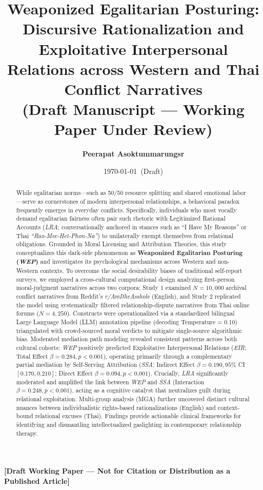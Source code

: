 \documentclass[11pt,a4paper]{article}
\title{\textbf{\Large Weaponized Egalitarian Posturing: Discursive Rationalization and Exploitative Interpersonal Relations across Western and Thai Conflict Narratives}\\[1.2ex]
\large \textbf{\textcolor{red!75!black}{(Draft Manuscript --- Working Paper Under Review)}}}
\author{\textbf{Peerapat Asoktummarungsr}}
\date{\today\ (Draft)}
\begin{document}
\maketitle
\thispagestyle{fancy}

\begin{center}
\small \textcolor{red!75!black}{\textbf{[Draft Working Paper --- Not for Citation or Distribution as a Published Article]}}
\end{center}
\vspace{1ex}

\begin{abstract}
\noindent While egalitarian norms---such as 50/50 resource splitting and shared emotional labor---serve as cornerstones of modern interpersonal relationships, a behavioral paradox frequently emerges in everyday conflicts. Specifically, individuals who most vocally demand egalitarian fairness often pair such rhetoric with Legitimized Rational Accounts (\textit{LRA}; conversationally anchored in stances such as ``I Have My Reasons'' or Thai \textit{``Rao-Mee-Het-Phon-Na''}) to unilaterally exempt themselves from relational obligations. Grounded in Moral Licensing and Attribution Theories, this study conceptualizes this dark-side phenomenon as \textbf{Weaponized Egalitarian Posturing (\textit{WEP})} and investigates its psychological mechanisms across Western and non-Western contexts. To overcome the social desirability biases of traditional self-report surveys, we employed a cross-cultural computational design analyzing first-person moral-judgment narratives across two corpora: Study 1 examined $N = 10,000$ archival conflict narratives from Reddit's \textit{r/AmItheAsshole} (English), and Study 2 replicated the model using systematically filtered relationship-dispute narratives from Thai online forums ($N = 4,250$). Constructs were operationalized via a standardized bilingual Large Language Model (LLM) annotation pipeline (decoding Temperature = 0.10) triangulated with crowd-sourced moral verdicts to mitigate single-source algorithmic bias. Moderated mediation path modeling revealed consistent patterns across both cultural cohorts: \textit{WEP} positively predicted Exploitative Interpersonal Relations (\textit{EIR}; Total Effect $\beta = 0.284, p < 0.001$), operating primarily through a complementary partial mediation by Self-Serving Attribution (\textit{SSA}; Indirect Effect $\beta = 0.190, 95\%$ CI $[0.170, 0.210]$; Direct Effect $\beta = 0.094, p < 0.001$). Crucially, \textit{LRA} significantly moderated and amplified the link between \textit{WEP} and \textit{SSA} (Interaction $\beta = 0.248, p < 0.001$), acting as a cognitive catalyst that neutralizes guilt during relational exploitation. Multi-group analysis (MGA) further uncovered distinct cultural nuances between individualistic rights-based rationalizations (English) and context-bound relational excuses (Thai). Findings provide actionable clinical frameworks for identifying and dismantling intellectualized gaslighting in contemporary relationship therapy.
\end{abstract}
\end{document}
